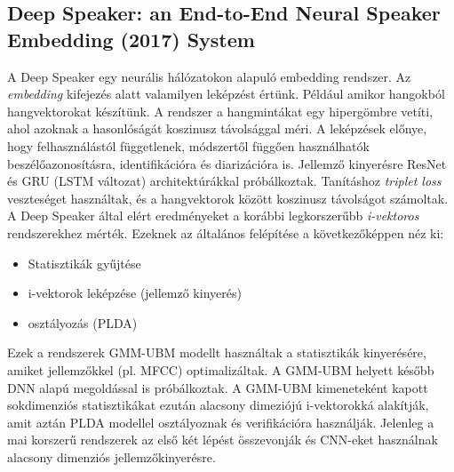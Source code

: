 \subsection{Deep Speaker: an End-to-End Neural Speaker Embedding (2017) System~\cite{deep_speaker}}

A Deep Speaker egy neurális hálózatokon alapuló embedding rendszer. Az \emph{embedding} kifejezés alatt valamilyen leképzést értünk. Például amikor hangokból hangvektorokat készítünk. A rendszer a hangmintákat egy hipergömbre vetíti, ahol azoknak a hasonlóságát koszinusz távolsággal méri.
\newline
\newline
A leképzések előnye, hogy felhasználástól függetlenek, módszertől függően használhatók beszélőazonosításra, identifikációra és diarizációra is. 
\newline
\newline
Jellemző kinyerésre ResNet és GRU (LSTM változat) architektúrákkal próbálkoztak. Tanításhoz \emph{triplet loss} veszteséget használtak, és a hangvektorok között koszinusz távolságot számoltak.
\newline
\newline
A Deep Speaker által elért eredményeket a korábbi legkorszerűbb \emph{i-vektoros} rendszerekhez mérték.
Ezeknek az általános felépítése a következőképpen néz ki:
\begin{itemize}
	\item Statisztikák gyűjtése
	\item i-vektorok leképzése (jellemző kinyerés)
	\item osztályozás (PLDA)
\end{itemize} 
Ezek a rendszerek GMM-UBM modellt használtak a statisztikák kinyerésére, amiket jellemzőkkel (pl. MFCC) optimalizáltak. A GMM-UBM helyett később
DNN alapú megoldással is próbálkoztak. A GMM-UBM kimeneteként kapott
sokdimenziós statisztikákat ezután alacsony dimeziójú i-vektorokká alakítják, amit aztán PLDA modellel osztályoznak és verifikációra használják.
Jelenleg a mai korszerű rendszerek az első két lépést összevonják és CNN-eket használnak alacsony dimenziós jellemzőkinyerésre.
